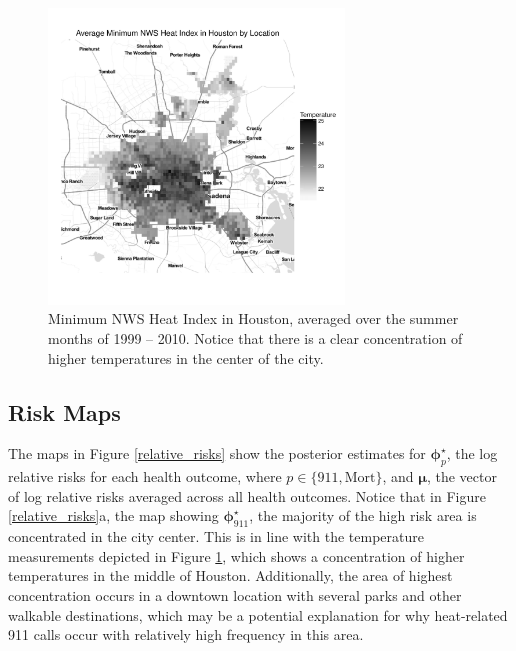 \documentclass[final]{statsoc}
\begin{document}
\begin{figure}
  \centering
  \includegraphics[width=0.7\textwidth]{imgs/avg_himin.pdf}
  \caption{Minimum NWS Heat Index in Houston, averaged over the summer months of 1999 -- 2010. Notice that there is a clear concentration of higher temperatures in the center of the city.}
  \label{fig:temp}
\end{figure}

\subsection{Risk Maps}
The maps in Figure \ref{relative_risks} show the posterior estimates for $\boldsymbol\phi^\star_{p}$, the log relative risks for each health outcome, where $p\in \{911,\text{Mort}\}$, and $\boldsymbol\mu$, the vector of log relative risks averaged across all health outcomes. Notice that in Figure \ref{relative_risks}a, the map showing $\boldsymbol\phi^\star_{911}$, the majority of the high risk area is concentrated in the city center. This is in line with the temperature measurements depicted in Figure \ref{fig:temp}, which shows a concentration of higher temperatures in the middle of Houston. Additionally, the area of highest concentration occurs in a downtown location with several parks and other walkable destinations, which may be a potential explanation for why heat-related 911 calls occur with relatively high frequency in this area. 
\end{document}
